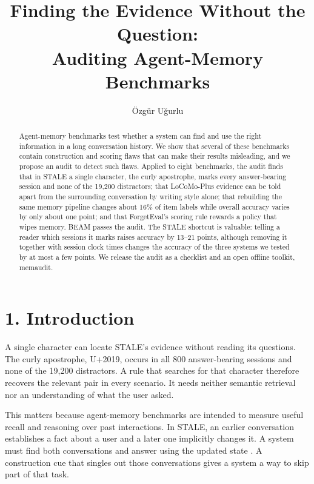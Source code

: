 \documentclass[11pt]{article}
\title{\LARGE\bfseries Finding the Evidence Without the Question:\\[0.25em] Auditing Agent-Memory Benchmarks}
\author{Özgür Uğurlu}
\date{}
\begin{document}
\maketitle
\begin{abstract}
\noindent Agent-memory benchmarks test whether a system can find and use the right information in a long conversation history. We show that several of these benchmarks contain construction and scoring flaws that can make their results misleading, and we propose an audit to detect such flaws. Applied to eight benchmarks, the audit finds that in STALE a single character, the curly apostrophe, marks every answer-bearing session and none of the 19,200 distractors; that LoCoMo-Plus evidence can be told apart from the surrounding conversation by writing style alone; that rebuilding the same memory pipeline changes about 16\% of item labels while overall accuracy varies by only about one point; and that ForgetEval's scoring rule rewards a policy that wipes memory. BEAM passes the audit. The STALE shortcut is valuable: telling a reader which sessions it marks raises accuracy by 13--21 points, although removing it together with session clock times changes the accuracy of the three systems we tested by at most a few points. We release the audit as a checklist and an open offline toolkit, memaudit.

\label{main-1}
\end{abstract}

\section{1. Introduction}\label{introduction}

A single character can locate STALE's evidence without reading its questions. The curly apostrophe, U+2019, occurs in all 800 answer-bearing sessions and none of the 19,200 distractors. A rule that searches for that character therefore recovers the relevant pair in every scenario. It needs neither semantic retrieval nor an understanding of what the user asked.

This matters because agent-memory benchmarks are intended to measure useful recall and reasoning over past interactions. In STALE, an earlier conversation establishes a fact about a user and a later one implicitly changes it. A system must find both conversations and answer using the updated state \citep{Chao2026STALE}. A construction cue that singles out those conversations gives a system a way to skip part of that task.
\end{document}

